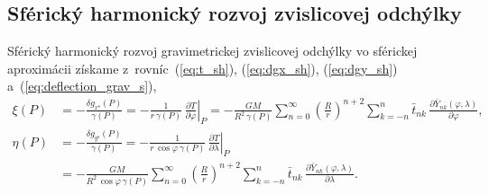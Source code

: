 \documentclass[a4paper, 12pt]{book}
\begin{document}
\subsection{Sférický harmonický rozvoj zvislicovej odchýlky}

Sférický harmonický rozvoj gravimetrickej zvislicovej odchýlky vo sférickej 
aproximácii získame z~rovníc~(\ref{eq:t_sh}), (\ref{eq:dgx_sh}), 
(\ref{eq:dgy_sh}) a~(\ref{eq:deflection_grav_s}),
%
\begin{equation}
\label{eq:deflection_grav_s_sph}
\begin{split}
\xi(P) &= -\frac{\delta g_{x^\mathrm{s}}(P)}{\gamma(P)} = -\frac{1}{r \, 
\gamma(P)} \, \left.\frac{\partial T}{\partial \varphi}\right|_P 
= -\frac{GM}{R^2 \, \gamma(P)} \sum_{n = 0}^\infty \left( \frac{R}{r} 
\right)^{n + 2} \sum_{k = -n}^{n} \bar{t}_{nk} \, \frac{\partial 
\bar{Y}_{nk}(\varphi, \lambda)}{\partial \varphi}{,}\\
%
\eta(P) &= -\frac{\delta g_{y^\mathrm{s}}(P)}{\gamma(P)} = -\left.\frac{1}{r \, 
\cos\varphi \,\gamma(P)} \, \frac{\partial T}{\partial \lambda}\right|_P\\
%
&= - \frac{GM}{R^2 \, \cos\varphi \, \gamma(P)} \sum_{n = 0}^\infty \left( 
\frac{R}{r} \right)^{n + 2} \sum_{k = -n}^{n}\bar{t}_{nk} \, \frac{\partial 
\bar{Y}_{nk}(\varphi, \lambda)}{\partial \lambda}{.}\\
\end{split}
\end{equation}
\end{document}
